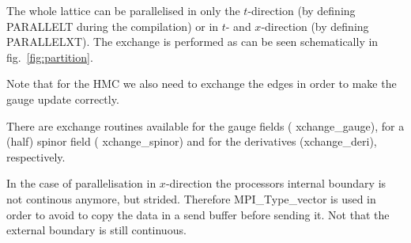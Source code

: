 The whole lattice can be parallelised in only the $t$-direction (by
defining {\ttfamily PARALLELT} during the compilation) or in $t$-
and $x$-direction (by defining {\ttfamily PARALLELXT}). The exchange is
performed as can be seen schematically in fig.~\ref{fig:partition}.

Note that for the HMC we also need to exchange the edges in order to
make the gauge update correctly.

There are exchange routines available for the gauge fields ({\ttfamily
  xchange\_gauge}), for a (half) spinor field ({\ttfamily
  xchange\_spinor}) and for the derivatives ({\ttfamily xchange\_deri}),
respectively.

In the case of parallelisation in $x$-direction the processors
internal boundary is not continous anymore, but strided. Therefore
{\ttfamily MPI\_Type\_vector} is used in order to avoid to copy the data
in a send buffer before sending it. Not that the external boundary is
still continuous.




